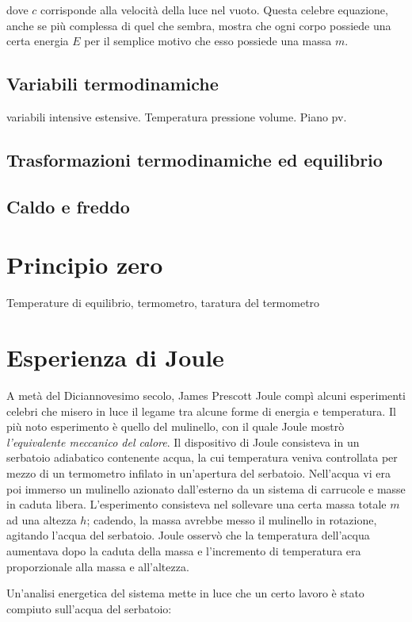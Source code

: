 \noindent dove $c$ corrisponde alla velocità della luce nel vuoto.
Questa celebre equazione, anche se più complessa di quel che
sembra, mostra che ogni corpo possiede una certa energia $E$ per il semplice
motivo che esso possiede una massa $m$.

\subsection{Variabili termodinamiche}
variabili intensive estensive. Temperatura pressione volume. Piano pv.


\subsection{Trasformazioni termodinamiche ed equilibrio}

\subsection{Caldo e freddo}

\section{Principio zero}
Temperature di equilibrio, termometro, taratura del termometro

\section{Esperienza di Joule}
A metà del Diciannovesimo secolo, James Prescott Joule compì alcuni
esperimenti celebri che misero in luce il legame tra alcune forme di
energia e temperatura. Il più noto esperimento è quello del mulinello,
con il quale Joule mostrò \textit{l'equivalente meccanico del calore}.
Il dispositivo di Joule consisteva in un serbatoio adiabatico contenente
acqua, la cui temperatura veniva controllata per mezzo di un termometro
infilato in un'apertura del serbatoio. Nell'acqua vi era poi immerso
un mulinello azionato dall'esterno da un sistema di carrucole e masse
in caduta libera. L'esperimento consisteva nel sollevare una certa
massa totale $m$ ad una altezza $h$; cadendo, la massa avrebbe messo
il mulinello in rotazione, agitando l'acqua del serbatoio. Joule
osservò che la temperatura dell'acqua aumentava dopo la caduta della
massa e l'incremento di temperatura era proporzionale alla massa e all'altezza.

Un'analisi energetica del sistema mette in luce che un certo lavoro è
stato compiuto sull'acqua del serbatoio:

